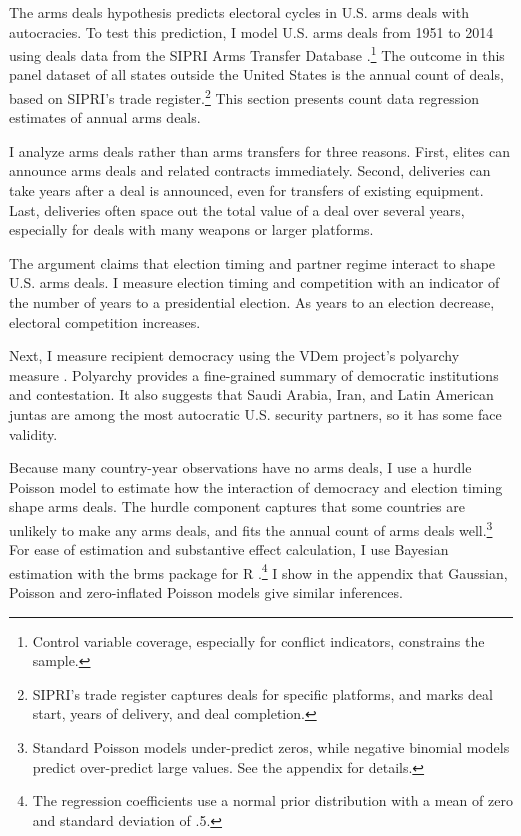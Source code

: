 \documentclass[12pt]{article}
\begin{document}
The arms deals hypothesis predicts electoral cycles in U.S. arms deals with autocracies.
To test this prediction, I model U.S. arms deals from 1951 to 2014 using deals data from the SIPRI Arms Transfer Database \citep{SIPRI2021}.\footnote{Control variable coverage, especially for conflict indicators, constrains the sample.}
The outcome in this panel dataset of all states outside the United States is the annual count of deals, based on SIPRI's trade register.\footnote{SIPRI's trade register captures deals for specific platforms, and marks deal start, years of delivery, and deal completion.}
This section presents count data regression estimates of annual arms deals. 


I analyze arms deals rather than arms transfers for three reasons.
First, elites can announce arms deals and related contracts immediately. 
Second, deliveries can take years after a deal is announced, even for transfers of existing equipment. 
Last, deliveries often space out the total value of a deal over several years, especially for deals with many weapons or larger platforms. 


The argument claims that election timing and partner regime interact to shape U.S. arms deals. 
I measure election timing and competition with an indicator of the number of years to a presidential election. 
As years to an election decrease, electoral competition increases. 


Next, I measure recipient democracy using the VDem project's polyarchy measure \citep{Coppedgeetal2008}. 
Polyarchy provides a fine-grained summary of democratic institutions and contestation.
It also suggests that Saudi Arabia, Iran, and Latin American juntas are among the most autocratic U.S. security partners, so it has some face validity.  


Because many country-year observations have no arms deals, I use a hurdle Poisson model to estimate how the interaction of democracy and election timing shape arms deals.
The hurdle component captures that some countries are unlikely to make any arms deals, and fits the annual count of arms deals well.\footnote{Standard Poisson models under-predict zeros, while negative binomial models predict over-predict large values. See the appendix for details.} 
For ease of estimation and substantive effect calculation, I use Bayesian estimation with the brms package for \textsf{R} \citep{Buerkner2017}.\footnote{The regression coefficients use a normal prior distribution with a mean of zero and standard deviation of .5.}
I show in the appendix that Gaussian, Poisson and zero-inflated Poisson models give similar inferences. 
\end{document}
